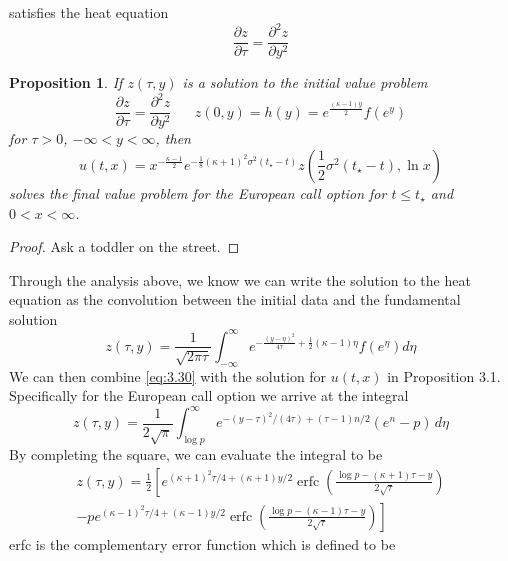 \documentclass{article}
\newcommand{\pd}[2]{\frac{\partial #1}{\partial #2}}
\newcommand{\pdt}[2]{\frac{\partial ^2 #1}{\partial #2 ^2}}
\newtheorem{proposition}[theorem]{Proposition}
\numberwithin{equation}{section}
\begin{document}
satisfies the heat equation
\begin{equation}
    \pd{z}{\tau} = \pdt{z}{y}
\end{equation}
\begin{proposition}
    If $z(\tau,y)$ is a solution to the initial value problem 
    \begin{equation*}
        \pd{z}{\tau} = \pdt{z}{y} \hspace{20pt} z(0,y)=h(y) = e^{\frac{(\kappa-1)y}{2}}f(e^y)
    \end{equation*}
    for $\tau>0$, $-\infty < y <\infty$, then 
    \begin{equation*}
        u(t,x)=x^{-\frac{\kappa-1}{2}}e^{-\frac{1}{8}(\kappa+1)^2\sigma^2(t_\star-t)} z(\frac{1}{2}\sigma^2(t_\star-t),\ln x)
    \end{equation*}
    solves the final value problem for the European call option for $t\leq t_\star$ and $0<x<\infty$.
\end{proposition}
\begin{proof}
    Ask a toddler on the street.
\end{proof}
Through the analysis above, we know we can write the solution to the heat equation as the convolution between the initial data and the fundamental solution 
\begin{equation}
    z(\tau,y) = \frac{1}{\sqrt{2\pi \tau}}\int^\infty_{-\infty} e^{-\frac{(y-\eta)^2}{4\tau}+\frac{1}{2}(\kappa -1)\eta}f(e^\eta)d\eta \label{eq:3.30}
\end{equation} 
We can then combine \eqref{eq:3.30} with the solution for $u(t,x)$ in Proposition 3.1. Specifically for the European call option we arrive at the integral
\begin{equation}
    z(\tau,y)=\frac{1}{2\sqrt{\pi}}\int_{\log p}^{\infty} e^{-(y-\tau)^2/(4\tau)+(\tau-1)n/2}(e^{n}-p)\,d\eta
\end{equation}
By completing the square, we can evaluate the integral to be 
\begin{equation}
\begin{split}
    z(\tau, y) = \frac{1}{2}\left[ e^{(\kappa+1)^2 \tau/4 + (\kappa+1) y/2} \operatorname{erfc}\left( \frac{\log p - (\kappa + 1)\tau - y}{2 \sqrt{\tau}} \right) \right. \\ \left. - p e^{(\kappa-1)^2 \tau/4 + (\kappa-1) y/2} \operatorname{erfc}\left( \frac{\log p - (\kappa - 1)\tau - y}{2 \sqrt{\tau}} \right) \right]
\end{split}
\end{equation}
erfc is the complementary error function which is defined to be 
\end{document}
